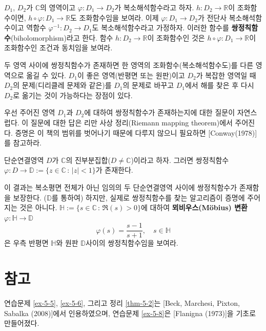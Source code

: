 \begin{salt_exercise}\label{ex-5-11}
$D_1$, $D_2$가 $\mathbb C$의 영역이고
$\varphi: D_1 \to D_2$가 복소해석함수라고 하자.
$h:D_2\to \mathbb R$이 조화함수이면,
$h\circ \varphi : D_1 \to \mathbb R$도 조화함수임을 보여라.
이제 $\varphi: D_1 \to D_2$가 전단사 복소해석함수이고
역함수 $\varphi^{-1}: D_2 \to D_1$도 복소해석함수라고 가정하자.
이러한 함수를 {\bf 쌍정칙함수}(biholomorphism)라고 한다.
함수 $h:D_2\to \mathbb R$이 조화함수인 것은
$h\circ \varphi : D_1 \to \mathbb R$이 조화함수인 조건과 동치임을 보여라.

두 영역 사이에 쌍정칙함수가 존재하면
한 영역의 조화함수(복소해석함수도)를 다른 영역으로 옮길 수 있다.
$D_1$이 좋은 영역(반평면 또는 원판)이고 $D_2$가 복잡한 영역일 때
$D_2$의 문제(디리클레 문제와 같은)를 $D_1$의 문제로 바꾸고
$D_1$에서 해를 찾은 후 다시 $D_2$로 옮기는 것이 가능하다는 장점이 있다.

우선 주어진 영역 $D_1$과 $D_2$에 대하여
쌍정칙함수가 존재하는지에 대한 질문이 자연스럽다.
이 질문에 대한 답은 리만 사상 정리(Riemann mapping theorem)에서 주어진다.
증명은 이 책의 범위를 벗어나기 때문에 다루지 않으니
필요하면 [Conway(1978)]를 참고하라.


\begin{salttheorem}[리만 사상 정리]{}{} \label{thm-5-5}
 단순연결영역 $D$가 $\mathbb C$의 진부분집합($D\ne \mathbb C$)이라고 하자.
 그러면 쌍정칙함수 $\varphi: D\to \mathbb D:=\{z\in\mathbb C\,:\, |z|<1\}$가
 존재한다.
\end{salttheorem}

이 결과는 복소평면 전체가 아닌 임의의 두 단순연결영역 사이에
쌍정칙함수가 존재함을 보장한다. ($\mathbb D$를 통하여)
하지만, 실제로 쌍정칙함수를 찾는 알고리즘이 증명에 주어지는 것은 아니다.
$\mathbb H:= \{s\in\mathbb C\,:\, \Re(s) >0 \}$에 대하여
{\bf 뫼비우스(M\"obius) 변환} $\varphi: \mathbb H \to \mathbb D$
\[ 
\varphi(s) = \dfrac{s-1}{s+1},
\quad s\in \mathbb H
\]
은 우측 반평면 $\mathbb H$와 원판  $\mathbb D$사이의 쌍정칙함수임을 보여라.
\end{salt_exercise}

\section{참고}

연습문제 \ref{ex-5-5}, \ref{ex-5-6}, 그리고 정리 \ref{thm-5-2}는
[Beck, Marchesi, Pixton, Sabalka (2008)]에서 인용하였으며,
연습문제 \ref{ex-5-8}은 [Flanigna (1973)]을 기초로 만들어졌다.

